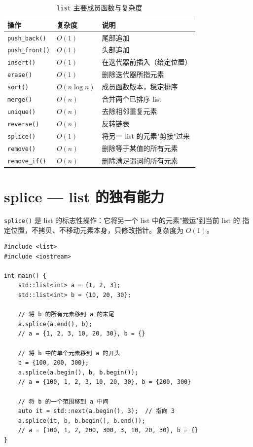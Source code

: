 \documentclass[12pt,a4paper,fontset=fandol]{ctexbook}
\newcommand{\Fn}[1]{\texttt{#1()}}
\newcommand{\Tp}[1]{\texttt{#1}}
\begin{document}
\begin{table}[htbp]
\centering
\caption{\Tp{list} 主要成员函数与复杂度}
\begin{tabularx}{\textwidth}{l l X}
\toprule
\textbf{操作} & \textbf{复杂度} & \textbf{说明} \\
\midrule
\Fn{push\_back}     & $O(1)$ & 尾部追加 \\
\Fn{push\_front}    & $O(1)$ & 头部追加 \\
\Fn{insert}         & $O(1)$ & 在迭代器前插入（给定位置） \\
\Fn{erase}          & $O(1)$ & 删除迭代器所指元素 \\
\Fn{sort}           & $O(n \log n)$ & 成员函数版本，稳定排序 \\
\Fn{merge}          & $O(n)$ & 合并两个已排序 list \\
\Fn{unique}         & $O(n)$ & 去除相邻重复元素 \\
\Fn{reverse}        & $O(n)$ & 反转链表 \\
\Fn{splice}         & $O(1)$ & 将另一 list 的元素"剪接"过来 \\
\Fn{remove}         & $O(n)$ & 删除等于某值的所有元素 \\
\Fn{remove\_if}     & $O(n)$ & 删除满足谓词的所有元素 \\
\bottomrule
\end{tabularx}
\end{table}

\section{splice --- list 的独有能力}

\Fn{splice} 是 list 的标志性操作：它将另一个 list 中的元素"搬运"到当前 list 的
指定位置，不拷贝、不移动元素本身，只修改指针。复杂度为 $O(1)$。

\begin{lstlisting}
#include <list>
#include <iostream>

int main() {
    std::list<int> a = {1, 2, 3};
    std::list<int> b = {10, 20, 30};

    // 将 b 的所有元素移到 a 的末尾
    a.splice(a.end(), b);
    // a = {1, 2, 3, 10, 20, 30}, b = {}

    // 将 b 中的单个元素移到 a 的开头
    b = {100, 200, 300};
    a.splice(a.begin(), b, b.begin());
    // a = {100, 1, 2, 3, 10, 20, 30}, b = {200, 300}

    // 将 b 的一个范围移到 a 中间
    auto it = std::next(a.begin(), 3);  // 指向 3
    a.splice(it, b, b.begin(), b.end());
    // a = {100, 1, 2, 200, 300, 3, 10, 20, 30}, b = {}
}
\end{lstlisting}
\end{document}
